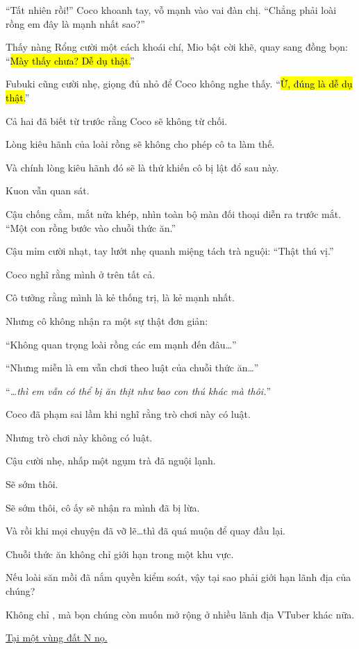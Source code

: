 \documentclass[../main.tex]{subfiles}
\begin{document}
``Tất nhiên rồi!'' Coco khoanh tay, vỗ mạnh vào vai đàn chị. ``Chẳng phải loài rồng em đây là mạnh nhất sao?''

Thấy nàng Rổng cười một cách khoái chí, Mio bật cời khẽ, quay sang đồng bọn: ``\hl{Mày thấy chưa? Dễ dụ thật.}''

Fubuki cũng cười nhẹ, giọng đủ nhỏ để Coco không nghe thấy. ``\hl{Ừ, đúng là dễ dụ thật.}''

Cả hai đã biết từ trước rằng Coco sẽ không từ chối.

Lòng kiêu hãnh của loài rồng sẽ không cho phép cô ta làm thế.

Và chính lòng kiêu hãnh đó sẽ là thứ khiến cô bị lật đổ sau này.

\il

Kuon vẫn quan sát.

Cậu chống cằm, mắt nửa khép, nhìn toàn bộ màn đối thoại diễn ra trước mắt. ``Một con rồng bước vào chuỗi thức ăn.''

Cậu mỉm cười nhạt, tay lướt nhẹ quanh miệng tách trà nguội: ``Thật thú vị.''

Coco nghĩ rằng mình ở trên tất cả.

Cô tưởng rằng mình là kẻ thống trị, là kẻ mạnh nhất.

Nhưng cô không nhận ra một sự thật đơn giản:

``Không quan trọng loài rồng các em mạnh đến đâu\dots''

``Nhưng miễn là em vẫn chơi theo luật của chuỗi thức ăn\dots''

``\emph{\dots thì em vẫn có thể bị ăn thịt như bao con thú khác mà thôi.}''

Coco đã phạm sai lầm khi nghĩ rằng trò chơi này có luật.

Nhưng trò chơi này không có luật.

Cậu cười nhẹ, nhấp một ngụm trà đã nguội lạnh.

Sẽ sớm thôi.

Sẽ sớm thôi, cô ấy sẽ nhận ra mình đã bị lừa.

Và rồi khi mọi chuyện đã vỡ lẽ\dots thì đã quá muộn để quay đầu lại.

\ct

Chuỗi thức ăn không chỉ giới hạn trong một khu vực.

Nếu loài săn mồi đã nắm quyền kiểm soát, vậy tại sao phải giới hạn lãnh địa của chúng?

Không chỉ \hll, mà bọn chúng còn muốn mở rộng ở nhiều lãnh địa VTuber khác nữa.

\begin{center}
  \uline{Tại một vùng đất N nọ.}
\end{center}
\end{document}
